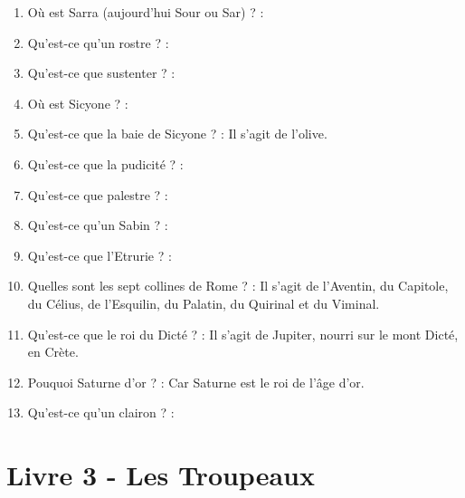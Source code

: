 \documentclass[a4paper, 11pt, hidelinks]{article}
\begin{document}
\begin{enumerate}
      \item Où est Sarra (aujourd'hui Sour ou Sar) ? :
      \item Qu'est-ce qu'un rostre ? :
      \item Qu'est-ce que sustenter ? :
      \item Où est Sicyone ? :
      \item Qu'est-ce que la baie de Sicyone ? : Il s'agit de l'olive.
      \item Qu'est-ce que la pudicité ? :
      \item Qu'est-ce que palestre ? :
      \item Qu'est-ce qu'un Sabin ? :
      \item Qu'est-ce que l'Etrurie ? :
      \item Quelles sont les sept collines de Rome ? : Il s'agit de l'Aventin, du Capitole, du Célius, de l'Esquilin, du Palatin,
            du Quirinal et du Viminal.
      \item Qu'est-ce que le roi du Dicté ? : Il s'agit de Jupiter, nourri sur le mont Dicté, en Crète.
      \item Pouquoi Saturne d'or ? : Car Saturne est le roi de l'âge d'or.
      \item Qu'est-ce qu'un clairon ? : 
\end{enumerate}

\section{Livre 3 - Les Troupeaux}
\end{document}
